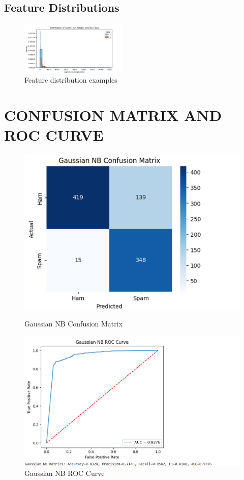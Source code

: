 \documentclass[12pt]{article}
\begin{document}
\subsection*{Feature Distributions}
\begin{figure}[H]
\centering
\includegraphics[width=0.45\textwidth]{feature.jpeg}
\caption{Feature distribution examples}
\end{figure}

\section*{CONFUSION MATRIX AND ROC CURVE}

\begin{figure}[H]
\centering
\begin{minipage}{0.45\textwidth}
\centering
\includegraphics[width=\linewidth]{6.png}
\caption{Gaussian NB Confusion Matrix}
\end{minipage}
\hfill
\begin{minipage}{0.45\textwidth}
\centering
\includegraphics[width=\linewidth]{7.png}
\caption{Gaussian NB ROC Curve}
\end{minipage}
\end{figure}
\end{document}

